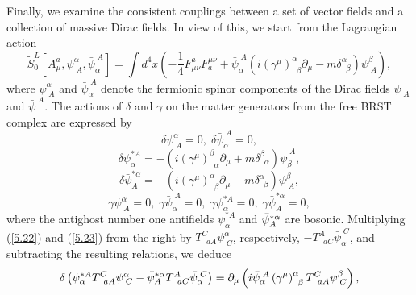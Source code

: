 \documentclass[a4paper,12pt]{article}
\begin{document}
Finally, we examine the consistent couplings
between a set of vector fields
and a collection of massive Dirac fields.
In view of this, we start from the
Lagrangian action
\begin{equation}
\tilde{S}_{0}^{L}\left[ A_{\mu }^{a},
\psi _{\;A}^{\alpha },\bar{\psi}%
_{\alpha }^{\;A}\right] =\int d^{4}x\left( -
\frac{1}{4}F_{\mu \nu
}^{a}F_{a}^{\mu \nu }+
\bar{\psi}_{\alpha }^{\;A}\left( i\left( \gamma ^{\mu
}\right) _{\;\;\beta }^{\alpha }\partial _{\mu }-
m\delta _{\;\;\beta
}^{\alpha }\right) \psi _{\;A}^{\beta }\right) ,
\label{5.20}
\end{equation}
where $\psi _{\;A}^{\alpha }$ and
$\bar{\psi}_{\alpha }^{\;A}$ denote the
fermionic spinor components of the
Dirac fields $\psi _{\;A}$ and $\bar{\psi}%
^{\;A}$. The actions of $\delta $ and
$\gamma $ on the matter generators
from the free BRST complex are expressed by
\begin{equation}
\delta \psi _{\;A}^{\alpha }=
0,\;\delta \bar{\psi}_{\alpha }^{\;A}=0,
\label{5.21}
\end{equation}
\begin{equation}
\delta \psi _{\alpha }^{*A}=
-\left( i\left( \gamma ^{\mu }\right)
_{\;\;\alpha }^{\beta }\partial _{\mu }+
m\delta _{\;\;\alpha }^{\beta
}\right) \bar{\psi}_{\beta }^{\;A},
\label{5.22}
\end{equation}
\begin{equation}
\delta \bar{\psi}_{A}^{*\alpha }=
-\left( i\left( \gamma ^{\mu }\right)
_{\;\;\beta }^{\alpha }\partial _{\mu }-
m\delta _{\;\;\beta }^{\alpha
}\right) \psi _{\;A}^{\beta },  \label{5.23}
\end{equation}
\begin{equation}
\gamma \psi _{\;A}^{\alpha }=0,\;\gamma 
\bar{\psi}_{\alpha
}^{\;A}=0,\;\gamma \psi _{\alpha }^{*A}=
0,\;\gamma \bar{\psi}_{A}^{*\alpha
}=0,  \label{5.24}
\end{equation}
where the antighost number one antifields
$\psi _{\alpha }^{*A}$ and $\bar{%
\psi}_{A}^{*\alpha }$ are bosonic.
Multiplying (\ref{5.22}) and (\ref{5.23})
from the right by $T_{\;\;aA}^{C}\psi _{\;C}^{\alpha }$,
respectively, $%
-T_{\;\;aC}^{A}\bar{\psi}_{\alpha }^{\;C}$,
and subtracting the resulting
relations, we deduce
\begin{equation}
\delta \left( \psi _{\alpha }^{*A}T_{\;\;aA}^{C}
\psi _{\;C}^{\alpha }-\bar{%
\psi}_{A}^{*\alpha }T_{\;\;aC}^{A}
\bar{\psi}_{\alpha }^{\;C}\right)
=\partial _{\mu }\left( 
i\bar{\psi}_{\alpha }^{\;A}\left( \gamma ^{\mu
}\right) _{\;\;\beta }^{\alpha }
T_{\;\;aA}^{C}\psi _{\;C}^{\beta }\right) ,
\label{5.25}
\end{equation}
\end{document}
